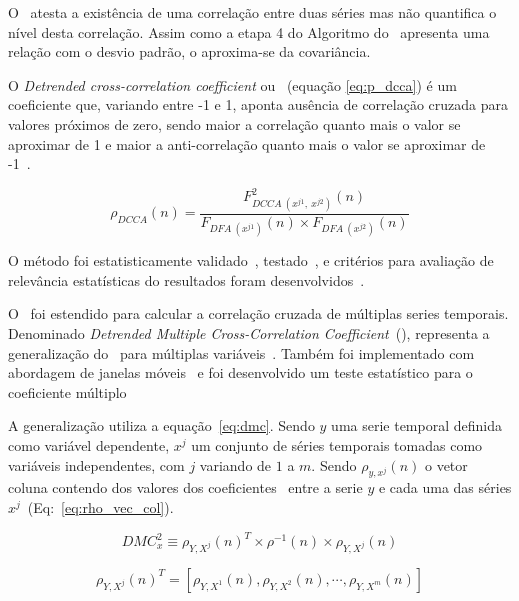 O \dcca~atesta a existência de uma correlação entre duas séries mas não quantifica o nível desta correlação. Assim como a etapa 4 do Algoritmo do \dfa~apresenta uma relação com o desvio padrão, o \dcca aproxima-se da covariância.

O \emph{Detrended cross-correlation coefficient} ou \pdcca~(equação \ref{eq:p_dcca}) é um coeficiente que, variando entre -1 e 1, aponta ausência de correlação cruzada para valores próximos de zero, sendo maior a correlação quanto mais o valor se aproximar de 1 e maior a anti-correlação quanto mais o valor se aproximar de -1~\cite{Zebende2011}.

\begin{equation}
  {\rho}_{DCCA}(n) = \frac{F_{DCCA~(x^{j1},~x^{j2})}^{2}(n)}
  {F_{DFA~(x^{j1})}(n) \times F_{DFA~(x^{j2})}(n)}
  \label{eq:p_dcca}
\end{equation}



O método foi estatisticamente validado~\cite{PhysRevE.84.066118}, testado~\cite{vassolerZebende2012, Guedes2017, Ferreira2018},
e critérios para avaliação de relevância estatísticas do resultados foram desenvolvidos~\cite{Guedes2018,Guedes2018a}.

O \pdcca~foi estendido para calcular a correlação cruzada de múltiplas series temporais. Denominado \emph{Detrended Multiple Cross-Correlation Coefficient}~(\dmc), representa a generalização do \pdcca~para múltiplas variáveis~\cite{Zebende2018}. Também foi implementado com abordagem de janelas móveis~\cite{Guedes2021} e foi desenvolvido um teste estatístico para o coeficiente múltiplo~\cite{DaSilvaFilho2021}

A generalização utiliza a equação~\ref{eq:dmc}. Sendo $y$ uma serie temporal definida como variável dependente, $x^{j}$ um conjunto de séries temporais tomadas como variáveis independentes, com $j$ variando de $1$ a $m$. Sendo $\rho_{y,x^{j}}(n)$ o vetor coluna contendo dos valores dos coeficientes \pdcca~entre a serie $y$ e cada uma das séries $x^{j}$~(Eq:~\ref{eq:rho_vec_col}). 

\begin{equation}
  {DMC}_{x}^{2}  \equiv \rho_{Y,X^{j}}(n)^{T} \times \rho^{-1}(n) \times \rho_{Y,X^{j}}(n)
  \label{eq:dmc}
\end{equation}

\begin{equation} \label{eq:rho_vec_col}
  \rho_{Y,X^{j}}(n)^T=[\rho_{Y,X^1}(n), \rho_{Y,X^2}(n),\cdots,\rho_{Y,X^m}(n)]
\end{equation}

